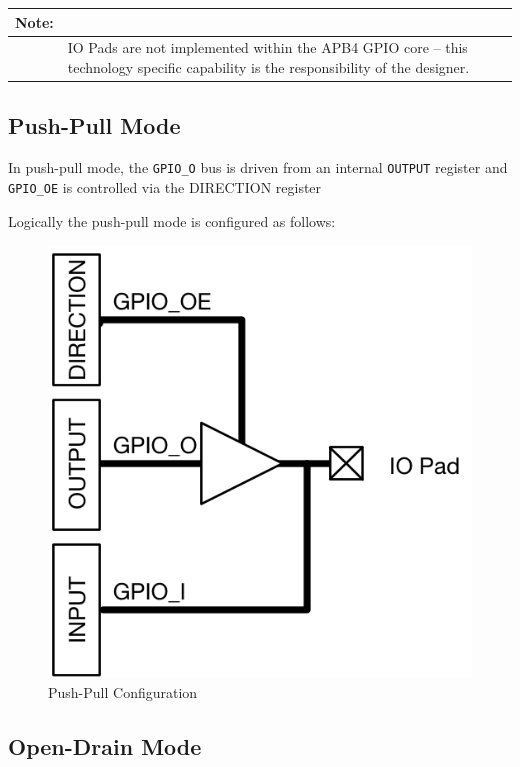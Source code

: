 \begin{longtable}[]{@{}|p{2cm}p{12cm}@{}}
	\textbf{Note:} & \\
	\endhead
	 & IO Pads are not implemented within the APB4 GPIO core --
	this technology specific capability is the responsibility of the
	designer.\\
\end{longtable}

\subsection{Push-Pull Mode}\label{push-pull-mode}

In push-pull mode, the \texttt{GPIO\_O} bus is driven from an internal \texttt{OUTPUT}
register and \texttt{GPIO\_OE} is controlled via the
DIRECTION register 

Logically the push-pull mode is configured as follows:

\begin{figure}[tbh]
	\centering
	\includegraphics{assets/img/apb4-gpio-pp.png}
	\caption{Push-Pull Configuration}
	\label{fig:apb4-gpio-pp}
\end{figure}


\subsection{Open-Drain Mode}\label{open-drain-mode}

